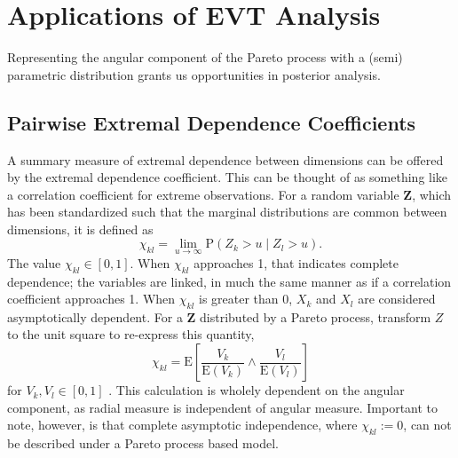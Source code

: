 \section{Applications of EVT Analysis}
\label{ref:applications}
Representing the angular component of the Pareto process with a (semi) parametric distribution grants
  us opportunities in posterior analysis.
%

\subsection{Pairwise Extremal Dependence Coefficients}
A summary measure of extremal dependence between dimensions can be offered by the extremal dependence
  coefficient.  This can be thought of as something like a correlation coefficient for extreme
  observations.  For a random variable $\bm{Z}$, which has been standardized such that the marginal
  distributions are common between dimensions, it is defined as
  \begin{equation}
    \chi_{kl} = \lim\limits_{u\to\infty}\text{P}\left(Z_k > u\mid Z_l > u\right).
  \end{equation}
  The value $\chi_{kl} \in [0,1]$.  When $\chi_{kl}$ approaches 1, that indicates complete dependence;
  the variables are linked, in much the same manner as if a correlation coefficient approaches 1.
  When $\chi_{kl}$ is greater than 0, $X_k$ and $X_l$ are considered asymptotically dependent.  For
  a $\bm{Z}$ distributed by a Pareto process, \cite{warner2018} transform $Z$ to the unit square to
  re-express this quantity,
  \begin{equation}
    \label{eqn:extdepcoef}
    \chi_{kl} = \text{E}\left[\frac{V_k}{\text{E}(V_k)}\wedge\frac{V_l}{\text{E}(V_l)}\right]
  \end{equation}
  for $V_k,V_l \in [0,1]$ .  This calculation is wholely dependent on the angular component, as radial
  measure is independent of angular measure.  Important to note, however, is that complete asymptotic
  independence, where $\chi_{kl} := 0$, can not be described under a Pareto process based model.

